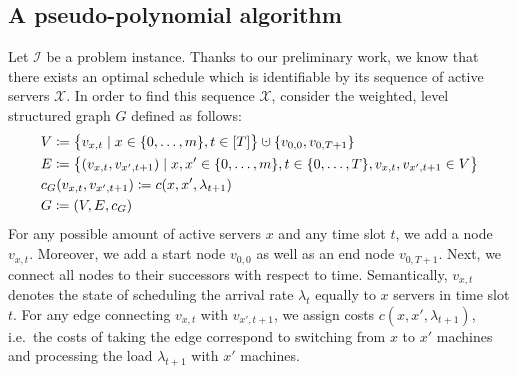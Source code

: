 \documentclass[hidelinks]{article}
\theoremstyle{plain}
\theoremstyle{definition}
\theoremstyle{rem}
\newcommand{\mx}{\mathcal{X}}
\newcommand{\inp}{\mathcal{I}}
\newcommand{\costs}{c}
\newcommand{\fromto}[2]{\{#1,\ldots,#2\}}
\newcommand{\dotcup}{\mathbin{\mathaccent\cdot\cup}}
\begin{document}
\subsection{A pseudo-polynomial algorithm}\label{sec_opt_offline_pseudo_poly}
Let $\inp$ be a problem instance. Thanks to our preliminary work, we know that there exists an optimal schedule which is identifiable by its sequence of active servers $\mx$. In order to find this sequence $\mx$, consider the weighted, level structured graph $G$ defined as follows:
\begin{align*}
	&V\coloneqq\bigl\{v_{x,t}\mid x\in\fromto{0}{m},t\in[T]\bigr\}\dotcup\{v_{0,0},v_{0,T+1}\}\\
	&E\coloneqq\bigl\{(v_{x,t},v_{x',t+1})\mid x,x'\in\fromto{0}{m},t\in\fromto{0}{T},v_{x,t},v_{x',t+1}\in V\bigr\}\\
	&c_G(v_{x,t},v_{x',t+1})\coloneqq\costs(x,x',\lambda_{t+1})\\
	&G\coloneqq(V,E,c_G)
\end{align*}
For any possible amount of active servers $x$ and any time slot $t$, we add a node $v_{x,t}$. Moreover, we add a start node $v_{0,0}$ as well as an end node $v_{0,T+1}$. Next, we connect all nodes to their successors with respect to time. Semantically, $v_{x,t}$ denotes the state of scheduling the arrival rate $\lambda_{t}$ equally to $x$ servers in time slot $t$. For any edge connecting $v_{x,t}$ with $v_{x',t+1}$, we assign costs $\costs(x,x',\lambda_{t+1})$, i.e.\ the costs of taking the edge correspond to switching from $x$ to $x'$ machines and processing the load $\lambda_{t+1}$ with $x'$ machines.
\end{document}
